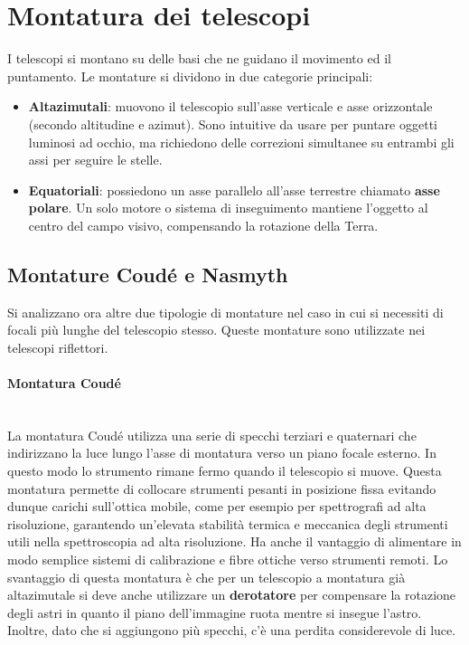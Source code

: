\documentclass[a4paper, oneside]{book}
\begin{document}
\section{Montatura dei telescopi}
I telescopi si montano su delle basi che ne guidano il movimento ed il puntamento. Le montature
si dividono in due categorie principali:
\begin{itemize}
    \item \textbf{Altazimutali}: muovono il telescopio sull'asse verticale e asse orizzontale (secondo altitudine e azimut).
    Sono intuitive da usare per puntare oggetti luminosi ad occhio, ma richiedono delle correzioni simultanee
    su entrambi gli assi per seguire le stelle.
    \item \textbf{Equatoriali}: possiedono un asse parallelo all'asse terrestre chiamato
    \textbf{asse polare}. Un solo motore o sistema di inseguimento mantiene l'oggetto al centro del
    campo visivo, compensando la rotazione della Terra. 
\end{itemize}

\subsection{Montature Coudé e Nasmyth}
Si analizzano ora altre due tipologie di montature 
nel caso in cui si necessiti di focali più lunghe del telescopio stesso. Queste montature
sono utilizzate nei telescopi riflettori.
\paragraph{Montatura Coudé} \mbox{} \\
\noindent La montatura Coudé utilizza una serie di specchi terziari e quaternari che indirizzano la luce lungo l'asse di montatura
verso un piano focale esterno. In questo modo lo strumento rimane fermo quando il telescopio si muove. Questa
montatura permette di collocare strumenti pesanti in posizione fissa evitando dunque carichi sull'ottica mobile, 
come per esempio per spettrografi ad alta risoluzione, garantendo un'elevata stabilità termica 
e meccanica degli strumenti utili nella spettroscopia ad alta risoluzione. Ha anche il vantaggio di alimentare
in modo semplice sistemi di calibrazione e fibre ottiche verso strumenti remoti. Lo svantaggio di questa montatura è 
che per un telescopio a montatura già altazimutale si deve anche utilizzare un
\textbf{derotatore} per compensare la rotazione degli astri in quanto il piano dell'immagine ruota mentre si insegue l'astro. 
Inoltre, dato che si aggiungono più specchi, c'è una perdita considerevole di luce.
\end{document}
